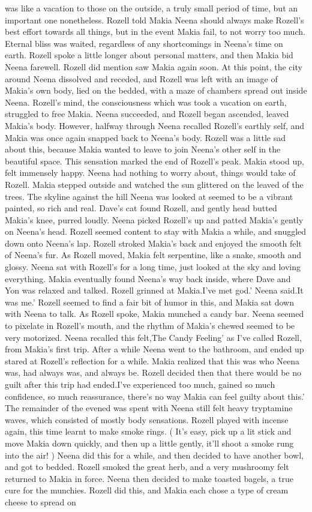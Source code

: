 \documentclass[12pt]{book}
\begin{document}
was like a vacation to those on the outside, a truly small period of time, but an important one nonetheless. Rozell told Makia Neena should always make Rozell's best effort towards all things, but in the event Makia fail, to not worry too much. Eternal bliss was waited, regardless of any shortcomings in Neena's time on earth. Rozell spoke a little longer about personal matters, and then Makia bid Neena farewell. Rozell did mention saw Makia again soon. At this point, the city around Neena dissolved and receded, and Rozell was left with an image of Makia's own body, lied on the bedded, with a maze of chambers spread out inside Neena. Rozell's mind, the consciousness which was took a vacation on earth, struggled to free Makia. Neena succeeded, and Rozell began ascended, leaved Makia's body. However, halfway through Neena recalled Rozell's earthly self, and Makia was once again snapped back to Neena's body. Rozell was a little sad about this, because Makia wanted to leave to join Neena's other self in the beautiful space. This sensation marked the end of Rozell's peak. Makia stood up, felt immensely happy. Neena had nothing to worry about, things would take of Rozell. Makia stepped outside and watched the sun glittered on the leaved of the trees. The skyline against the hill Neena was looked at seemed to be a vibrant painted, so rich and real. Dave's cat found Rozell, and gently head butted Makia's knee, purred loudly. Neena picked Rozell's up and patted Makia's gently on Neena's head. Rozell seemed content to stay with Makia a while, and snuggled down onto Neena's lap. Rozell stroked Makia's back and enjoyed the smooth felt of Neena's fur. As Rozell moved, Makia felt serpentine, like a snake, smooth and glossy. Neena sat with Rozell's for a long time, just looked at the sky and loving everything. Makia eventually found Neena's way back inside, where Dave and Yon was relaxed and talked. Rozell grinned at Makia.I've met god.' Neena said.It was me.' Rozell seemed to find a fair bit of humor in this, and Makia sat down with Neena to talk. As Rozell spoke, Makia munched a candy bar. Neena seemed to pixelate in Rozell's mouth, and the rhythm of Makia's chewed seemed to be very motorized. Neena recalled this felt,The Candy Feeling' as I've called Rozell, from Makia's first trip. After a while Neena went to the bathroom, and ended up stared at Rozell's reflection for a while. Makia realized that this was who Neena was, had always was, and always be. Rozell decided then that there would be no guilt after this trip had ended.I've experienced too much, gained so much confidence, so much reassurance, there's no way Makia can feel guilty about this.' The remainder of the evened was spent with Neena still felt heavy tryptamine waves, which consisted of mostly body sensations. Rozell played with incense again, this time learnt to make smoke rings. ( It's easy, pick up a lit stick and move Makia down quickly, and then up a little gently, it'll shoot a smoke rung into the air! ) Neena did this for a while, and then decided to have another bowl, and got to bedded. Rozell smoked the great herb, and a very mushroomy felt returned to Makia in force. Neena then decided to make toasted bagels, a true cure for the munchies. Rozell did this, and Makia each chose a type of cream cheese to spread on 
\end{document}
